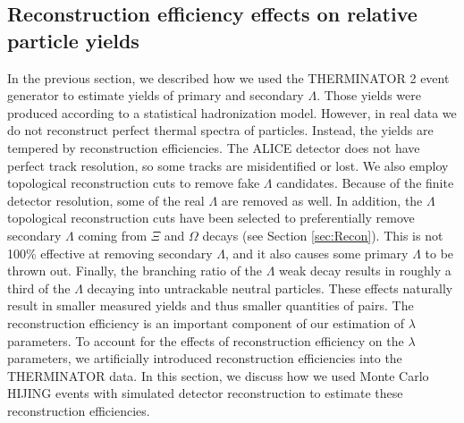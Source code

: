 \subsection{Reconstruction efficiency effects on relative particle yields}
\label{sec:ReconstructionEff}

  

In the previous section, we described how we used the THERMINATOR 2 event generator to estimate yields of primary and secondary $\Lambda$.
Those yields were produced according to a statistical hadronization model.
However, in real data we do not reconstruct perfect thermal spectra of particles. 
Instead, the yields are tempered by reconstruction efficiencies.
The ALICE detector does not have perfect track resolution, so some tracks are misidentified or lost.
We also employ topological reconstruction cuts to remove fake $\Lambda$ candidates.
Because of the finite detector resolution, some of the real $\Lambda$ are removed as well.
In addition, the $\Lambda$ topological reconstruction cuts have been selected to preferentially remove secondary $\Lambda$ coming from $\Xi$ and $\Omega$ decays (see Section \ref{sec:Recon}).
This is not 100\% effective at removing secondary $\Lambda$, and it also causes some primary $\Lambda$ to be thrown out.
Finally, the branching ratio of the $\Lambda$ weak decay results in roughly a third of the $\Lambda$ decaying into untrackable neutral particles.
These effects naturally result in smaller measured yields and thus smaller quantities of pairs.
The reconstruction efficiency is an important component of our estimation of $\lambda$ parameters.
To account for the effects of reconstruction efficiency on the $\lambda$ parameters, we artificially introduced reconstruction efficiencies into the THERMINATOR data. 
In this section, we discuss how we used Monte Carlo HIJING events with simulated detector reconstruction to estimate these reconstruction efficiencies.

